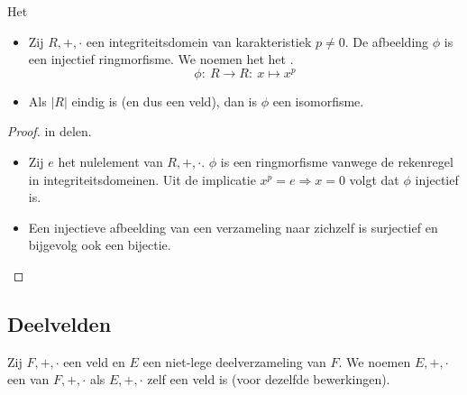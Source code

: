 \documentclass[main.tex]{subfiles}
\begin{document}
\begin{st}
  Het \\
  \begin{itemize}
  \item Zij $R,+,\cdot$ een integriteitsdomein van karakteristiek $p\neq 0$.
    De afbeelding $\phi$ is een injectief ringmorfisme.
    We noemen het het .
    \[ \phi:\ R \rightarrow R:\ x \mapsto x^{p} \]
  \item Als $|R|$ eindig is (en dus een veld), dan is $\phi$ een isomorfisme.
  \end{itemize}

  \begin{proof}
    in delen.
    \begin{itemize}
    \item Zij $e$ het nulelement van $R,+,\cdot$.  $\phi$ is een
      ringmorfisme vanwege de rekenregel in
      integriteitsdomeinen.
      Uit de implicatie $x^{p} = e \Rightarrow x = 0$ volgt dat $\phi$
      injectief is.  
    \item Een injectieve afbeelding van een verzameling naar zichzelf is surjectief en bijgevolg ook een bijectie. 
    \end{itemize}
  \end{proof}
\end{st}


\subsection{Deelvelden}
\label{sec:deelvelden}

\begin{de}
  Zij $F,+,\cdot$ een veld en $E$ een niet-lege deelverzameling van $F$.
  We noemen $E,+,\cdot$ een  van $F,+,\cdot$ als $E,+,\cdot$ zelf een veld is (voor dezelfde bewerkingen).
\end{de}
\end{document}

